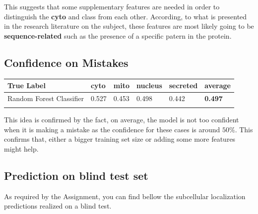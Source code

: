 \documentclass{bioinfo}
\begin{document}
\begin{methods}
This suggests that some supplementary features are needed in order to distinguish the \textbf{cyto} and  class from each other. According, to what is presented in the research literature on the subject, these features are most likely going to be \textbf{sequence-related} such as the presence of a specific patern in the protein.

\subsection{Confidence on Mistakes}

\begin{table}[H]
 {
\begin{tabular}{@{}llllll@{}}

\toprule 
True Label & cyto & mito & nucleus & secreted & \textbf{average}\\
\midrule
Random Forest Classifier &  0.527 & 0.453 & 0.498 & 0.442 & \textbf{0.497}\\
\botrule

\end{tabular}}{}
\end{table}

This idea is confirmed by the fact, on average, the model is not too confident when it is making a mistake as the confidence for these cases is around $50\%$. This confirms that, either a bigger training set size or adding some more features might help.  


\subsection{Prediction on blind test set}

As required by the Assignment, you can find bellow the subcellular localization predictions realized on a blind test.\\



\end{methods}
\end{document}
